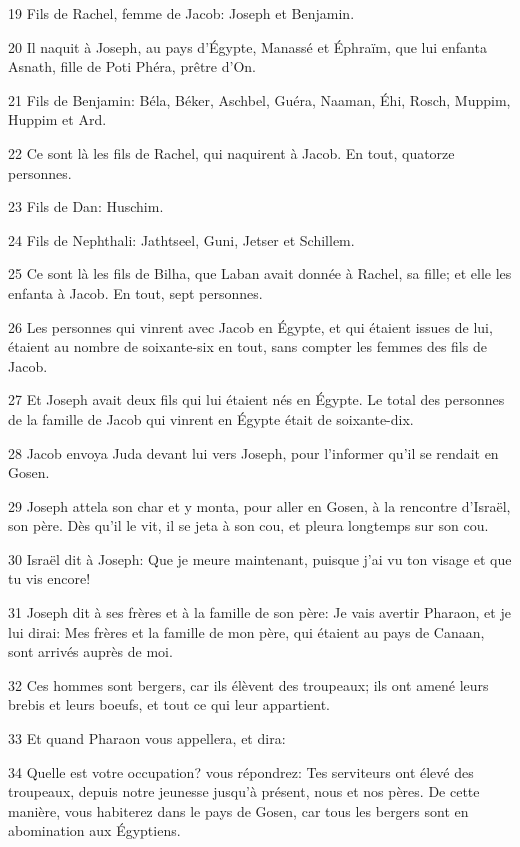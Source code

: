 \par 19 Fils de Rachel, femme de Jacob: Joseph et Benjamin.
\par 20 Il naquit à Joseph, au pays d'Égypte, Manassé et Éphraïm, que lui enfanta Asnath, fille de Poti Phéra, prêtre d'On.
\par 21 Fils de Benjamin: Béla, Béker, Aschbel, Guéra, Naaman, Éhi, Rosch, Muppim, Huppim et Ard.
\par 22 Ce sont là les fils de Rachel, qui naquirent à Jacob. En tout, quatorze personnes.
\par 23 Fils de Dan: Huschim.
\par 24 Fils de Nephthali: Jathtseel, Guni, Jetser et Schillem.
\par 25 Ce sont là les fils de Bilha, que Laban avait donnée à Rachel, sa fille; et elle les enfanta à Jacob. En tout, sept personnes.
\par 26 Les personnes qui vinrent avec Jacob en Égypte, et qui étaient issues de lui, étaient au nombre de soixante-six en tout, sans compter les femmes des fils de Jacob.
\par 27 Et Joseph avait deux fils qui lui étaient nés en Égypte. Le total des personnes de la famille de Jacob qui vinrent en Égypte était de soixante-dix.
\par 28 Jacob envoya Juda devant lui vers Joseph, pour l'informer qu'il se rendait en Gosen.
\par 29 Joseph attela son char et y monta, pour aller en Gosen, à la rencontre d'Israël, son père. Dès qu'il le vit, il se jeta à son cou, et pleura longtemps sur son cou.
\par 30 Israël dit à Joseph: Que je meure maintenant, puisque j'ai vu ton visage et que tu vis encore!
\par 31 Joseph dit à ses frères et à la famille de son père: Je vais avertir Pharaon, et je lui dirai: Mes frères et la famille de mon père, qui étaient au pays de Canaan, sont arrivés auprès de moi.
\par 32 Ces hommes sont bergers, car ils élèvent des troupeaux; ils ont amené leurs brebis et leurs boeufs, et tout ce qui leur appartient.
\par 33 Et quand Pharaon vous appellera, et dira:
\par 34 Quelle est votre occupation? vous répondrez: Tes serviteurs ont élevé des troupeaux, depuis notre jeunesse jusqu'à présent, nous et nos pères. De cette manière, vous habiterez dans le pays de Gosen, car tous les bergers sont en abomination aux Égyptiens.

